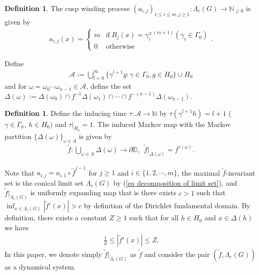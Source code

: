 \documentclass{article}
\theoremstyle{definition}
\newtheorem{definition}[thm]{Definition}
\begin{document}
\begin{definition}
    The cusp winding process $(a_{i,j})_{1\leq i\leq m,j\geq1}:\Lambda_c(G)\rightarrow \mathbb{N}_{\geq0}$ is given by
\begin{align} 
 a_{i,j}(x)= \left\{
 \begin{array}{cc}
   m   & \text{if}\  B_j(x)=\gamma_i^{\pm{(m+1)}} (\gamma_i \in \Gamma_0 )\\
   0   & \text{otherwise}\nonumber
 \end{array}
 \right. .
\end{align}
\end{definition}
Define 
\begin{align}
\mathcal{A}:=\bigcup_{l=0}^{\infty} \lbrace \gamma^{l+1}g:\gamma \in \Gamma_0,g \in H_0\rbrace \cup H_0\nonumber
\end{align}
and for $\omega=\omega_0\cdots\omega_{n-1} \in \mathcal{A}$, define the set
$\Delta({\omega}):=\Delta({\omega_0}) \cap f^{-1}\Delta({\omega_1}) \cap \cdots \cap f^{-(n-1)}\Delta({\omega_{n-1}}).$





\begin{definition}
Define the inducing time $\tau:\mathcal{A}\rightarrow \mathbb{N}$ by $\tau(\gamma^{l+1}h)={l+1}$ ($\gamma \in \Gamma_0,\ h\in H_0)$ and $\tau|_{H_0}=1$. The induced Markov map with the Markov partition $\lbrace \Delta({\omega}) \rbrace_{\omega \in A}$ is given by
\begin{align}
\tilde f: \bigcup_{\omega \in A} \Delta(\omega)  \rightarrow \partial \mathbb{D}, \ \ \tilde f|_{\Delta({\omega})}=f^{\tau(\omega)}. \nonumber
\end{align}
\end{definition}






Note that  $a_{i,j}=a_{i,1}\circ \tilde f^{j-1} $ for $j\geq 1$ and $i\in\lbrace1,2,\cdots,m\rbrace$, the maximal $\tilde f$-invariant set is the conical limit set $\Lambda_c(G)$ by (\ref{eq decomposition of limit set}), and $\tilde f|_{\Lambda_c(G)}$ is uniformly expanding map that is there exists $c>1$ such that $\inf_{x\in \Lambda_c(G)} |\tilde f'(x)|>c$ by definition of the Dirichlet fundamental domain. 
By definition, there exists a constant $Z\geq1$ such that for all $h\in H_0$ and $x\in\Delta(h)$ we have
\begin{align*}
    \frac{1}{Z}\leq |\tilde f'(x)|\leq Z.
\end{align*}
In this paper, we denote simply $\tilde f|_{\Lambda_c(G)}$ as $\tilde f$ and consider the pair $(\tilde f, \Lambda_c(G))$ as a dynamical system.
\end{document}

